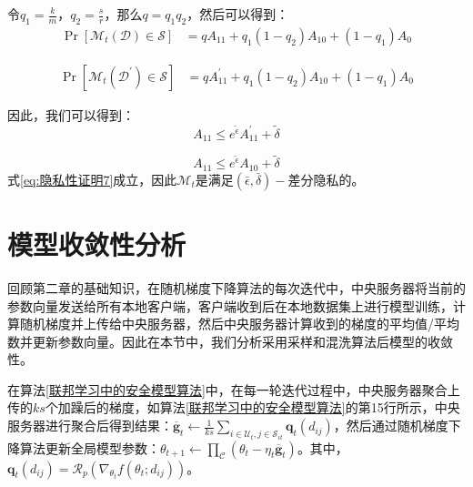 令$q_{1}=\frac{k}{m}$，$q_{2}=\frac{s}{r}$，那么$q=q_{1} q_{2}$，然后可以得到：
\begin{equation}\label{eq:隐私性证明6}
\begin{aligned} 
\operatorname{Pr}\left[\mathcal{M}_{t}(\mathcal{D}) \in \mathcal{S}\right] &=q A_{11}+q_{1}\left(1-q_{2}\right) A_{10}+\left(1-q_{1}\right) A_{0}
\end{aligned}
\end{equation}

\begin{equation}\label{eq:隐私性证明7}
\begin{aligned} 
\operatorname{Pr}\left[\mathcal{M}_{t}\left(\mathcal{D}^{\prime}\right) \in \mathcal{S}\right] &=q A_{11}^{\prime}+q_{1}\left(1-q_{2}\right) A_{10}+\left(1-q_{1}\right) A_{0} 
\end{aligned}
\end{equation}

因此，我们可以得到：
\begin{equation}\label{隐私性证明8}
A_{11} \leq e^{\tilde{\epsilon}} A_{11}^{\prime}+\tilde{\delta}
\end{equation}

\begin{equation}\label{隐私性证明9}
A_{11} \leq e^{\tilde{\epsilon}} A_{10}+\tilde{\delta}
\end{equation}
式\ref{eq:隐私性证明7}成立，因此$\mathcal{M}_{t}$是满足$(\bar{\epsilon}, \bar{\delta})-$差分隐私的。

\section{模型收敛性分析}
回顾第二章的基础知识，在随机梯度下降算法的每次迭代中，中央服务器将当前的参数向量发送给所有本地客户端，客户端收到后在本地数据集上进行模型训练，计算随机梯度并上传给中央服务器，然后中央服务器计算收到的梯度的平均值/平均数并更新参数向量。因此在本节中，我们分析采用采样和混洗算法后模型的收敛性。

在算法\ref{联邦学习中的安全模型算法}中，在每一轮迭代过程中，中央服务器聚合上传的$ks$个加躁后的梯度，如算法\ref{联邦学习中的安全模型算法}的第15行所示，中央服务器进行聚合后得到结果：$\overline{\mathbf{g}}_{t} \leftarrow \frac{1}{k s} \sum_{i \in \mathcal{U}_{t}, j \in \mathcal{S}_{i t}} \boldsymbol{q}_{t}\left(d_{i j}\right)$，然后通过随机梯度下降算法更新全局模型参数：$\theta_{t+1} \leftarrow \prod_{\mathcal{C}}\left(\theta_{t}-\eta_{t} \overline{\mathbf{g}}_{t}\right)$。其中，$\mathbf{q}_{t}\left(d_{i j}\right)=\mathcal{R}_{p}\left(\nabla_{\theta_{t}} f\left(\theta_{t} ; d_{i j}\right)\right)$。

